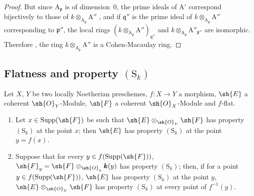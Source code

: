 \begin{proof}
But since $\mathrm{A}_\mathfrak{p}$ is of dimension~$0$, the prime ideals of $\mathrm{A}'$ correspond bijectively to those of $k\otimes_{\mathrm{A}_\mathfrak{p}}\mathrm{A}''$ , and if $\mathfrak{q}''$ is the prime ideal of $k\otimes_{\mathrm{A}_\mathfrak{p}}\mathrm{A}''$ corresponding to $\mathfrak{p}''$, the local rings $(k\otimes_{\mathrm{A}_\mathfrak{p}}\mathrm{A}'')_{\mathfrak{q}''}$ and $k\otimes_{\mathrm{A}_\mathfrak{p}}\mathrm{A}''_{\mathfrak{p}''}$ are isomorphic.
Therefore , the ring $k\otimes_{\mathrm{A}_\mathfrak{p}}\mathrm{A}''$ is a Cohen-Macaulay ring.
\end{proof}

\subsection{Flatness and property \texorpdfstring{$(\mathrm{S}_k)$}{(Sk)}}
\label{subsection:IV.6.4}

\begin{proposition}[6.4.1]
\label{IV.6.4.1}
Let $X$, $Y$ be two locally Noetherian preschemes, $f:X\to Y$ a morphism, $\sh{E}$ a coherent $\sh{O}_Y$-Module, $\sh{F}$ a coherent $\sh{O}_X$-Module and $f$-flat.
\begin{enumerate}[label=(\roman*)]
  \item Let $x\in\operatorname{Supp}(\sh{F})$ be such that $\sh{E}\otimes_{\sh{O}_Y}\sh{F}$ has property $(\mathrm{S}_k)$ at the point $x$; then $\sh{E}$ has property $(\mathrm{S}_k)$ at the point $y=f(x)$.
  \item Suppose that for every $y\in f(\operatorname{Supp}(\sh{F}))$, $\sh{F}_y=\sh{F}\otimes_{\sh{O}_y}\boldsymbol{k}(y)$ has property $(\mathrm{S}_k)$; then, if for a point $y\in f(\operatorname{Supp}(\sh{F}))$, $\sh{E}$ has property $(\mathrm{S}_k)$ at the point $y$, $\sh{E}\otimes_{\sh{O}_Y}\sh{F}$ has property $(\mathrm{S}_k)$ at every point of $f^{-1}(y)$.
\end{enumerate}
\end{proposition}

